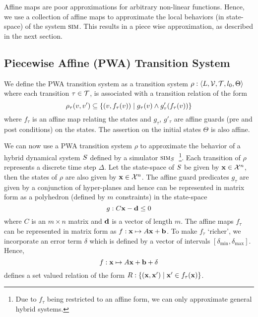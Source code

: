     Affine maps are poor
    approximations for arbitrary non-linear functions. Hence, we use a
    collection of affine maps to approximate the local behaviors (in
    state-space) of the system $\mbox{\sc sim}$. This results in a piece
    wise approximation, as described in the next section.

\subsection{Piecewise Affine (PWA) Transition System}

We define the PWA transition system as a transition system
$\rho:\left\langle L,\mathcal{V},\mathcal{T}, l_0,\Theta \right \rangle$
where each transition $\tau \in \mathcal{T}$, is associated with a
transition relation of the form
\[
    \rho_{\tau}(v,v') \subseteq \{(v,f_{\tau}(v)) \;|\; g_\tau(v) \land g'_\tau(f_{\tau}(v))\}
\]
where $f_{\tau}$ is an affine map relating the states and $g_{\tau}$,
$g'_{\tau}$ are affine guards (pre and post conditions) on the states.
The assertion on the initial states $\Theta$ is also affine.

We can now use a PWA transition system $\rho$ to approximate the
behavior of a hybrid dynamical system $S$ defined by a simulator
$\mbox{\sc sim}_{S}$~\footnote{Due to $f_\tau$ being restricted to an affine
form, we can only approximate general hybrid systems.}. Each
transition of $\rho$ represents a discrete time step $\Delta$. Let the
state-space of $S$ be given by $\mathbf{x}\in\mathcal{X}^n$, then the
states of $\rho$ are also given by $\mathbf{x}\in\mathcal{X}^n$. The affine guard
predicates $g_\tau$ are given by a conjunction of hyper-planes and
hence can be represented in matrix form as a polyhedron (defined by
$m$ constraints) in the state-space
\[
g:C\mathbf{x} - \mathbf{d} \le 0
\]
where $C$ is an $m \times n$ matrix and $\mathbf{d}$ is a vector of length
$m$. The affine maps $f_\tau$ can be represented in matrix form as
$f:\mathbf{x} \mapsto A\mathbf{x}+\mathbf{b}$. To make $f_\tau$ `richer', we incorporate
an error term $\delta$ which is defined by a vector of intervals
$[\delta_{\min},\delta_{\max}]$. Hence,
\[
f:\mathbf{x} \mapsto A\mathbf{x} + \mathbf{b} + \delta
\]
defines a set valued relation of the form $R:\{(\mathbf{x},\mathbf{x}') \;|\; \mathbf{x}'
\in f_\tau(\mathbf{x})\}$.



